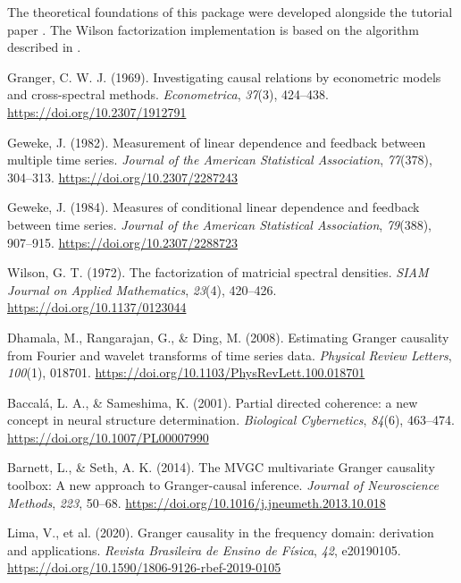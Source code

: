 \documentclass[10pt,a4paper,onecolumn]{article}
\newlength{\cslhangindent}
\newenvironment{CSLReferences}[2]
 {\begin{list}{}{%
  \setlength{\itemindent}{0pt}
  \setlength{\leftmargin}{0pt}
  \setlength{\parsep}{0pt}
  \ifodd #1
   \setlength{\leftmargin}{\cslhangindent}
   \setlength{\itemindent}{-1\cslhangindent}
  \fi
  \setlength{\itemsep}{#2\baselineskip}}}
 {\end{list}}
\begin{document}
The theoretical foundations of this package were developed alongside the
tutorial paper . The Wilson
factorization implementation is based on the algorithm described in
.

\protect{}\label{refs}
\begin{CSLReferences}{1}{0.5}

Granger, C. W. J. (1969). Investigating causal relations by econometric
models and cross-spectral methods. \emph{Econometrica}, \emph{37}(3),
424--438. \url{https://doi.org/10.2307/1912791}

Geweke, J. (1982). Measurement of linear dependence and feedback between
multiple time series. \emph{Journal of the American Statistical
Association}, \emph{77}(378), 304--313.
\url{https://doi.org/10.2307/2287243}

Geweke, J. (1984). Measures of conditional linear dependence and
feedback between time series. \emph{Journal of the American Statistical
Association}, \emph{79}(388), 907--915.
\url{https://doi.org/10.2307/2288723}

Wilson, G. T. (1972). The factorization of matricial spectral densities.
\emph{SIAM Journal on Applied Mathematics}, \emph{23}(4), 420--426.
\url{https://doi.org/10.1137/0123044}

Dhamala, M., Rangarajan, G., \& Ding, M. (2008). Estimating Granger
causality from Fourier and wavelet transforms of time series data.
\emph{Physical Review Letters}, \emph{100}(1), 018701.
\url{https://doi.org/10.1103/PhysRevLett.100.018701}

Baccalá, L. A., \& Sameshima, K. (2001). Partial directed coherence: a
new concept in neural structure determination. \emph{Biological
Cybernetics}, \emph{84}(6), 463--474.
\url{https://doi.org/10.1007/PL00007990}

Barnett, L., \& Seth, A. K. (2014). The MVGC multivariate Granger
causality toolbox: A new approach to Granger-causal inference.
\emph{Journal of Neuroscience Methods}, \emph{223}, 50--68.
\url{https://doi.org/10.1016/j.jneumeth.2013.10.018}

Lima, V., et al. (2020). Granger causality in the frequency domain:
derivation and applications. \emph{Revista Brasileira de Ensino de
Física}, \emph{42}, e20190105.
\url{https://doi.org/10.1590/1806-9126-rbef-2019-0105}


\end{CSLReferences}
\end{document}
